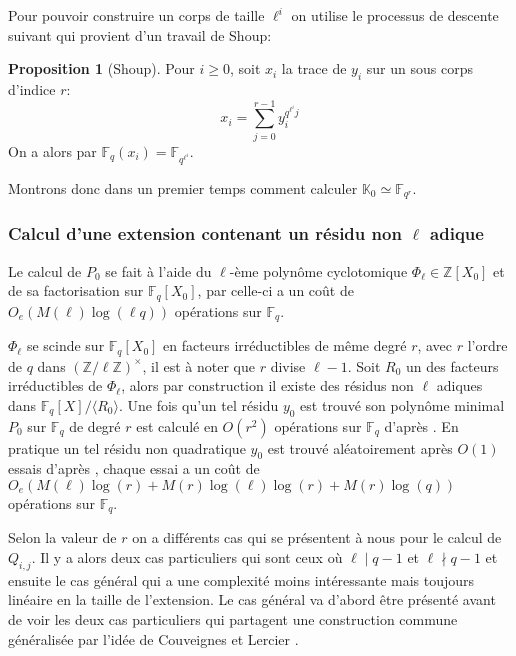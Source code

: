 \documentclass[10pt,a4paper]{book}
\theoremstyle{plain}
\theoremstyle{definition}
\theoremstyle{definition}
\theoremstyle{definition}
\newtheorem{prop}[thm]{Proposition}
\theoremstyle{definition}
\theoremstyle{remark}
\theoremstyle{remark}
\begin{document}
 Pour pouvoir construire un corps de taille $\ell^i$ on utilise le processus de descente suivant qui provient d'un  travail de Shoup:

\begin{prop}[Shoup]
Pour $i \geqslant 0$, soit $x_i$ la trace de $y_i$ sur un sous corps d'indice $r$:
\begin{equation*}
x_i=\sum_{j=0}^{r-1}y_i^{q^{\ell^i}j}
\end{equation*}
On a alors par \cite[Th. 2.1]{Shoup88} $\mathbb{F}_q(x_i)=\mathbb{F}_{q^{\ell^i}}$.
\end{prop}

Montrons donc dans un premier temps comment calculer $\mathbb{K}_0 \simeq \mathbb{F}_{q^r}$.



\subsubsection{Calcul d'une extension contenant un résidu non $\ell$ adique}
Le calcul de $P_0$ se fait à l'aide du $\ell$-ème polynôme cyclotomique $\Phi_{\ell} \in \mathbb{Z}[X_0]$ et de sa factorisation sur $\mathbb{F}_q[X_0]$, par \cite[Th.9]{Shoup93} celle-ci a un coût de $O_e(M(\ell)\log(\ell q))$ opérations sur $\mathbb{F}_q$.

$\Phi_{\ell}$ se scinde sur $\mathbb{F}_q[X_0]$ en facteurs irréductibles de même degré $r$, avec $r$ l'ordre de $q$ dans $(\mathbb{Z}/\ell \mathbb{Z})^{\times}$, il est à noter que $r$ divise $\ell-1$. Soit $R_0$ un des facteurs irréductibles de $\Phi_{\ell}$, alors par construction il existe des résidus non $\ell$ adiques dans $\mathbb{F}_q[X]/\langle R_0 \rangle$. Une fois qu'un tel résidu $y_0$ est trouvé son polynôme minimal $P_0$ sur $\mathbb{F}_q$ de degré $r$ est calculé en $O(r^2)$ opérations sur $\mathbb{F}_q$ d'après \cite[Th.4]{Shoup93}. 
En pratique un tel résidu non quadratique $y_0$ est trouvé aléatoirement après $O(1)$ essais d'après \cite[Lemma 15]{Shoup93}, chaque essai a un coût de $O_e(M(\ell)\log(r)+M(r)\log(\ell)\log(r)+M(r)\log(q))$ opérations sur $\mathbb{F}_q$.

Selon la valeur de $r$ on a différents cas qui se présentent à nous pour le calcul de $Q_{i,j}$. Il y a alors deux cas particuliers qui sont ceux où $\ell \mid q-1$ et $\ell \nmid q-1$ et ensuite le cas général qui a une complexité moins intéressante mais toujours linéaire en la taille de l'extension. Le cas général va d'abord être présenté avant de voir les deux cas particuliers qui partagent une construction commune généralisée par l'idée de Couveignes et Lercier \cite{couveignesLercier2013}.
\end{document}
